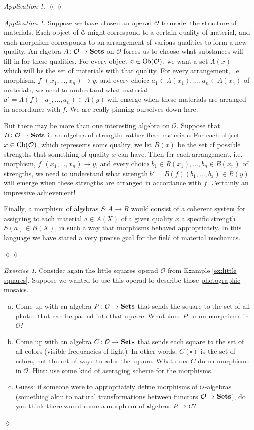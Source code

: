 \documentclass{book}
\def\tn{\textnormal}
\def\mc{\mathcal}
\def\Ob{\tn{Ob}}
\def\to{\rightarrow}
\def\taking{\colon}
\def\Sets{{\bf Sets}}
\def\mcO{\mc{O}}
\theoremstyle{remark}
\newtheorem{exc}[subsubsection]{Exercise}
\newenvironment{exercise}{\begin{exc}}{\hspace*{\fill}$\lozenge$\end{exc}}
\newtheorem{app}[subsubsection]{Application}
\newenvironment{application}{\begin{app}}{\hspace*{\fill}$\lozenge\lozenge$\end{app}}
\theoremstyle{definition}
\def\sexc{\begin{enumerate}[a.)]\setlength{\itemsep}{.1cm}\setlength{\parskip}{.1cm}\item}
\def\next{\item}
\def\endsexc{\end{enumerate}}
\begin{document}
\begin{application}
\end{application}

\begin{application}

Suppose we have chosen an operad $\mcO$ to model the structure of materials. Each object of $\mcO$ might correspond to a certain quality of material, and each morphism corresponds to an arrangement of various qualities to form a new quality. An algebra $A\taking\mcO\to\Sets$ on $\mcO$ forces us to choose what substances will fill in for these qualities. For every object $x\in\Ob(\mcO)$, we want a set $A(x)$ which will be the set of materials with that quality. For every arrangement, i.e. morphism, $f\taking (x_1,\ldots,x_n)\to y$, and every choice $a_1\in A(x_1), \ldots, a_n\in A(x_n)$ of materials, we need to understand what material $a'=A(f)(a_1,\ldots,a_n)\in A(y)$ will emerge when these materials are arranged in accordance with $f$. We are really pinning ourselves down here.

But there may be more than one interesting algebra on $\mcO$. Suppose that $B\taking\mcO\to\Sets$ is an algebra of strengths rather than materials. For each object $x\in\Ob(\mcO)$, which represents some quality, we let $B(x)$ be the set of possible strengths that something of quality $x$ can have. Then for each arrangement, i.e. morphism, $f\taking (x_1,\ldots,x_n)\to y$, and every choice $b_1\in B(x_1), \ldots, b_n\in B(x_n)$ of strengths, we need to understand what strength $b'=B(f)(b_1,\ldots,b_n)\in B(y)$ will emerge when these strengths are arranged in accordance with $f$. Certainly an impressive achievement!

Finally, a morphism of algebras $S\taking A\to B$ would consist of a coherent system for assigning to each material $a\in A(X)$ of a given quality $x$ a specific strength $S(a)\in B(X)$, in such a way that morphisms behaved appropriately. In this language we have stated a very precise goal for the field of material mechanics.

\end{application}

\begin{exercise}
Consider again the little squares operad $\mcO$ from Example \ref{ex:little squares}. Suppose we wanted to use this operad to describe those \href{http://en.wikipedia.org/wiki/Photographic_mosaic}{\text photographic mosaics}. 
\sexc Come up with an algebra $P\taking\mcO\to\Sets$ that sends the square to the set of all photos that can be pasted into that square. What does $P$ do on morphisms in $\mcO$?
\next Come up with an algebra $C\taking\mcO\to\Sets$ that sends each square to the set of all colors (visible frequencies of light). In other words, $C(\square)$ is the set of colors, not the set of ways to color the square. What does $C$ do on morphisms in $\mcO$. Hint: use some kind of averaging scheme for the morphisms.
\next Guess: if someone were to appropriately define morphisms of $\mcO$-algebras (something akin to natural transformations between functors $\mcO\to\Sets$), do you think there would some a morphism of algebras $P\to C$?
\endsexc
\end{exercise}
\end{document}
